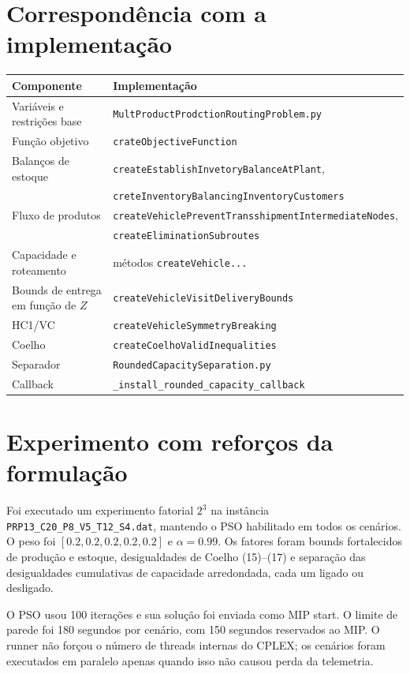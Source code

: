 \documentclass[11pt,a4paper]{article}
\begin{document}
\section{Correspondência com a implementação}

\begin{center}
\begin{tabular}{ll}
\toprule
Componente & Implementação \\
\midrule
Variáveis e restrições base & \texttt{MultProductProdctionRoutingProblem.py} \\
Função objetivo & \texttt{crateObjectiveFunction} \\
Balanços de estoque & \texttt{createEstablishInvetoryBalanceAtPlant},\\
& \texttt{creteInventoryBalancingInventoryCustomers} \\
Fluxo de produtos & \texttt{createVehiclePreventTransshipmentIntermediateNodes},\\
& \texttt{createEliminationSubroutes} \\
Capacidade e roteamento & métodos \texttt{createVehicle...} \\
Bounds de entrega em função de $Z$ & \texttt{createVehicleVisitDeliveryBounds} \\
HC1/VC & \texttt{createVehicleSymmetryBreaking} \\
Coelho & \texttt{createCoelhoValidInequalities} \\
Separador & \texttt{RoundedCapacitySeparation.py} \\
Callback & \texttt{\_install\_rounded\_capacity\_callback} \\
\bottomrule
\end{tabular}
\end{center}

\section{Experimento com reforços da formulação}

Foi executado um experimento fatorial $2^3$ na instância
\texttt{PRP13\_C20\_P8\_V5\_T12\_S4.dat}, mantendo o PSO habilitado em todos
os cenários. O peso foi $[0.2,0.2,0.2,0.2,0.2]$ e $\alpha=0.99$. Os fatores
foram bounds fortalecidos de produção e estoque, desigualdades de Coelho
(15)--(17) e separação das desigualdades cumulativas de capacidade arredondada,
cada um ligado ou desligado.

O PSO usou 100 iterações e sua solução foi enviada como MIP start. O limite de
parede foi 180 segundos por cenário, com 150 segundos reservados ao MIP. O
runner não forçou o número de threads internas do CPLEX; os cenários foram
executados em paralelo apenas quando isso não causou perda da telemetria.
\end{document}
